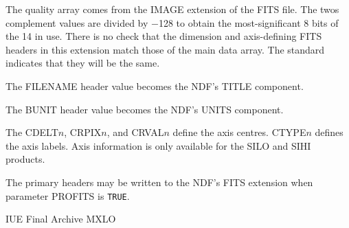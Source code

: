 {{{{{               \sstitem
               The quality array comes from the IMAGE extension of the
               FITS file.  The twos complement values are divided by $-$128 to
               obtain the most-significant 8 bits of the 14 in use.  There is
               no check that the dimension and axis-defining FITS headers in
               this extension match those of the main data array.  The
               standard indicates that they will be the same.

               \sstitem
               The FILENAME header value becomes the NDF's TITLE component.

               \sstitem
               The BUNIT header value becomes the NDF's UNITS component.

               \sstitem
               The CDELT$n$, CRPIX$n$, and CRVAL$n$ define the axis centres.
               CTYPE$n$ defines the axis labels.  Axis information is only
               available for the SILO and SIHI products.

               \sstitem
               The primary headers may be written to the NDF's FITS
               extension when parameter PROFITS is {\tt TRUE}.
            }
         }
         \bigskip

         \sstitem
         IUE Final Archive MXLO

         }}}
